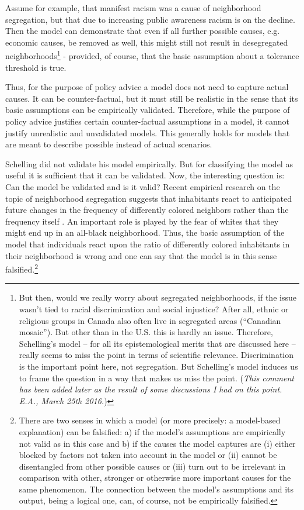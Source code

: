 \documentclass[12pt, english, a4paper]{article}
\begin{document}
\begin{enumerate}
  Assume for example, that manifest racism was a cause of neighborhood
  segregation, but that due to increasing public awareness racism is
  on the decline. Then the model can demonstrate that even if all
  further possible causes, e.g. economic causes, be removed as well,
  this might still not result in desegregated
  neighborhoods\footnote{But then, would we really worry about
    segregated neighborhoods, if the issue wasn't tied to racial
    discrimination and social injustice? After all, ethnic or
    religious groups in Canada also often live in segregated areas
    (``Canadian mosaic''). But other than in the U.S. this is hardly
    an issue. Therefore, Schelling's model -- for all its
    epistemological merits that are discussed here -- really seems to
    miss the point in terms of scientific relevance. Discrimination is
    the important point here, not segregation. But Schelling's model
    induces us to frame the question in a way that makes us miss the
    point. ({\em This comment has been added later as the result of
      some discussions I had on this point. E.A., March 25th 2016.})} -
    provided, of course, that the basic assumption about a tolerance
    threshold is true.

  Thus, for the purpose of policy advice a model does not need to
  capture actual causes. It can be counter-factual, but it must still
  be realistic in the sense that its basic assumptions can be
  empirically validated. Therefore, while the purpose of policy advice
  justifies certain counter-factual assumptions in a model, it cannot
  justify unrealistic and unvalidated models. This generally holds for
  models that are meant to describe possible instead of actual
  scenarios.

\end{enumerate}

Schelling did not validate his model empirically. But for classifying
the model as useful it is sufficient that it can be validated.  Now,
the interesting question is: Can the model be validated and is it
valid? Recent empirical research on the topic of neighborhood
segregation suggests that inhabitants react to anticipated future
changes in the frequency of differently colored neighbors rather than
the frequency itself \citep[124-125]{ellen:2000}. An important role is
played by the fear of whites that they might end up in an all-black
neighborhood. Thus, the basic assumption of the model that individuals
react upon the ratio of differently colored inhabitants in their
neighborhood is wrong and one can say that the model is in this sense
falsified.\footnote{There are two senses in which a model (or more
  precisely: a model-based explanation) can be falsified: a) if the
  model’s assumptions are empirically not valid as in this case and b)
  if the causes the model captures are (i) either blocked by factors
  not taken into account in the model or (ii) cannot be disentangled
  from other possible causes or (iii) turn out to be irrelevant in
  comparison with other, stronger or otherwise more important causes
  for the same phenomenon. The connection between the model’s
  assumptions and its output, being a logical one, can, of course, not
  be empirically falsified.}
\end{document}
